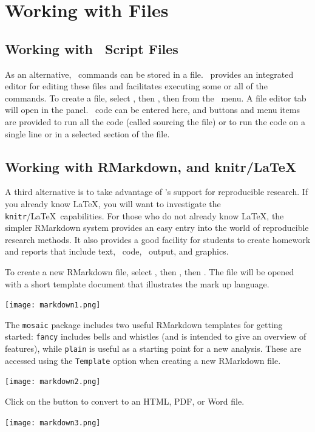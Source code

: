 \documentclass{tufte-book}\usepackage[]{graphicx}\usepackage[]{xcolor}
\renewcommand{\pkg}[1]{{\color{black}\texttt{#1}}}
\begin{document}
\section{Working with Files}

\subsection{Working with \R\ Script Files}
As an alternative, \R\ commands can be stored in a file.  \RStudio\ provides
an integrated editor for editing these files and facilitates executing some or all of 
the commands.  To create a file, select , then , then 
from the \RStudio\ menu.  A file editor tab will open in the  panel.  
\R\ code can be entered here, and 
buttons and menu items are provided to run all the code (called sourcing the file) or 
to run the code on a single line or in a selected section of the file.

\subsection{Working with RMarkdown, and knitr/\LaTeX}
A third alternative is to take advantage of \RStudio's support for reproducible research.
If you already know \LaTeX, you will want to investigate the \pkg{knitr}/\LaTeX\ capabilities.
For those who do not already know \LaTeX, the simpler RMarkdown system provides an easy
entry into the world of reproducible research methods.  It also provides a good facility
for students to create homework and reports that include text, \R\ code, \R\ output, and graphics.

To create a new RMarkdown file, select , then , then .
The file will be opened with a short template document that illustrates the mark up language.

\texttt{[image: markdown1.png]}


The \pkg{mosaic} package includes two useful RMarkdown templates for getting started: {\tt fancy} includes bells and whistles (and is intended to give an overview of features), while {\tt plain} is useful as a starting point for a new analysis.  These
are accessed using the {\tt Template} option when creating a new RMarkdown file.

\texttt{[image: markdown2.png]}


Click on the  button to convert to an HTML, PDF, or Word file.

\texttt{[image: markdown3.png]}
\end{document}
